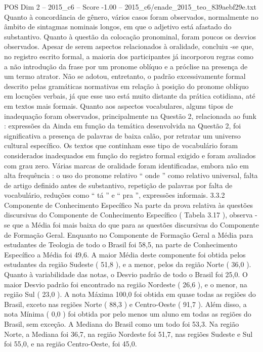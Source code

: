 \begin{textsample}{POS Dim 2 – 2015\_c6 – Score -1.00 – 2015\_c6/enade\_2015\_teo\_839aebf29e.txt}
Quanto à concordância de gênero, vários casos foram observados, normalmente no âmbito de sintagmas nominais longos, em que o adjetivo está afastado do substantivo.
Quanto à questão da colocação pronominal, foram poucos os desvios observados.
Apesar de serem aspectos relacionados à oralidade, concluiu -se que, no registro escrito formal, a maioria dos participantes já incorporou regras como a não introdução da frase por um pronome oblíquo e a próclise na presença de um termo atrator.
Não se adotou, entretanto, o padrão excessivamente formal descrito pelas gramáticas normativas em relação à posição do pronome oblíquo em locuções verbais, já que esse uso está muito distante da prática cotidiana, até em textos mais formais.
Quanto aos aspectos vocabulares, alguns tipos de inadequação foram observados, principalmente na Questão 2, relacionada ao funk : expressões da Ainda em função da temática desenvolvida na Questão 2, foi significativa a presença de palavras de baixa calão, por retratar um universo cultural específico.
Os textos que continham esse tipo de vocabulário foram considerados inadequados em função do registro formal exigido e foram avaliados com grau zero.
Várias marcas de oralidade foram identificadas, embora não em alta frequência : o uso do pronome relativo “ onde ” como relativo universal, falta de artigo definido antes de substantivo, repetição de palavras por falta de vocabulário, reduções como “ tá ” e “ pra ”, expressões informais. 3.3.2 Componente de Conhecimento Específico Na parte da prova relativa às questões discursivas do Componente de Conhecimento Específico ( Tabela 3.17 ), observa -se que a Média foi mais baixa do que para as questões discursivas do Componente de Formação Geral.
Enquanto no Componente de Formação Geral a Média para estudantes de Teologia de todo o Brasil foi 58,5, na parte de Conhecimento Específico a Média foi 49,6.
A maior Média deste componente foi obtida pelos estudantes da região Sudeste ( 51,8 ), e a menor, pelos da região Norte ( 36,0 ).
Quanto à variabilidade das notas, o Desvio padrão de todo o Brasil foi 25,0.
O maior Desvio padrão foi encontrado na região Nordeste ( 26,6 ), e o menor, na região Sul ( 23,0 ).
A nota Máxima 100,0 foi obtida em quase todas as regiões do Brasil, exceto nas regiões Norte ( 88,3 ) e Centro-Oeste ( 91,7 ).
Além disso, a nota Mínima ( 0,0 ) foi obtida por pelo menos um aluno em todas as regiões do Brasil, sem exceção.
A Mediana do Brasil como um todo foi 53,3.
Na região Norte, a Mediana foi 36,7, na região Nordeste foi 51,7, nas regiões Sudeste e Sul foi 55,0, e na região Centro-Oeste, foi 45,0.

\end{textsample}
